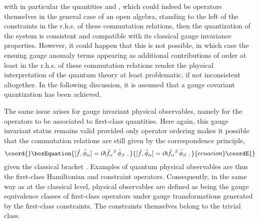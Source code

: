 \documentclass[a4paper,11pt]{article}
\begin{document}
with in particular the quantities \coordHE{} and
\coordHE{}, which could indeed be ope\-ra\-tors
themselves in the general case of an open algebra, standing to the left of 
the constraints in the r.h.s. of these commutation relations,
then the quantization of the system is consistent and compatible with
its classical gauge invariance properties. However, it could happen that
this is not possible, in which case the ensuing gauge anomaly terms
appearing as additional contributions of order at least \coordHE{}
in the r.h.s. of these commutation relations render the physical 
interpretation of the quantum theory at least problematic, if not 
inconsistent altogether. In the following discussion, it is assumed that
a gauge covariant quantization has been achieved.

The same issue arises for gauge invariant physical observables,
namely for the operators to be associated to first-class quantities.
Here again, this gauge invariant status remains valid provided only
operator ordering makes it possible that the commutation relations
are still given by the correspondence principle,
\begin{equation}\coord{}\boxEquation{
[\hat{f},\hat{\phi}_\alpha]=i\hbar{{\hat{f}}_\alpha}{}^\beta\,\hat{\phi}_\beta
\ ,
}{
[\hat{f},\hat{\phi}_\alpha]=i\hbar{{\hat{f}}_\alpha}{}^\beta\,\hat{\phi}_\beta
\ ,
}{ecuacion}\coordE{}\end{equation}
given the classical bracket \coordHE{}.
Examples of quantum physical observables are thus the first-class
Hamiltonian \coordHE{} and constraint \myHighlight{$\hat{\phi}_\alpha$}\coordHE{} operators.
Consequently, in the same way as at the classical level, physical 
obser\-va\-bles are defined as being the gauge equivalence classes of 
first-class operators under gauge transformations generated by the first-class
constraints. The constraints themselves belong to the trivial class.
\end{document}
